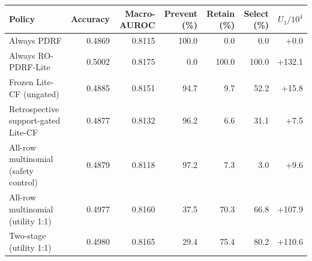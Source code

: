 \begin{tabular}{lrrrrrr}
\toprule
Policy & Accuracy & Macro-AUROC & Prevent (\%) & Retain (\%) & Select (\%) & $U_1/10^4$ \\
\midrule
Always PDRF & 0.4869 & 0.8115 & 100.0 & 0.0 & 0.0 & +0.0 \\
Always RO-PDRF-Lite & 0.5002 & 0.8175 & 0.0 & 100.0 & 100.0 & +132.1 \\
Frozen Lite-CF (ungated) & 0.4885 & 0.8151 & 94.7 & 9.7 & 52.2 & +15.8 \\
Retrospective support-gated Lite-CF & 0.4877 & 0.8132 & 96.2 & 6.6 & 31.1 & +7.5 \\
All-row multinomial (safety control) & 0.4879 & 0.8118 & 97.2 & 7.3 & 3.0 & +9.6 \\
All-row multinomial (utility 1:1) & 0.4977 & 0.8160 & 37.5 & 70.3 & 66.8 & +107.9 \\
Two-stage (utility 1:1) & 0.4980 & 0.8165 & 29.4 & 75.4 & 80.2 & +110.6 \\
\bottomrule
\end{tabular}
